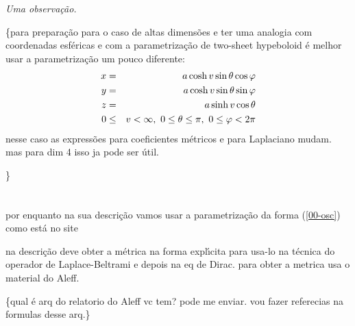 \documentclass[a4paper,12pt]{article}
\begin{document}
\textit{Uma observa\c{c}\~{a}o.}

\{para prepara\c{c}\~{a}o para o caso de altas dimens\~{o}es e ter uma
analogia com coordenadas esf\'{e}ricas e com a parametriza\c{c}\~{a}o de
two-sheet hypeboloid \'{e} melhor usar a parametriza\c{c}\~{a}o um pouco
diferente:%
\begin{eqnarray}
x &=&a\cosh v\sin \theta \cos \varphi   \label{00-osc2} \\
y &=&a\cosh v\sin \theta \sin \varphi   \notag \\
z &=&a\sinh v\cos \theta   \notag \\
0 &\leq &v<\infty ,\ 0\leq \theta \leq \pi ,\ 0\leq \varphi <2\pi   \notag
\end{eqnarray}%
nesse caso as express\~{o}es para coeficientes m\'{e}tricos e para
Laplaciano mudam. mas para dim 4 isso ja pode ser \'{u}til.

\}

$\frac{{}}{{}}$

por enquanto na sua descri\c{c}\~{a}o vamos usar a parametriza\c{c}\~{a}o da
forma (\ref{00-osc}) como est\'{a} no site

na descri\c{c}\~{a}o deve obter a m\'{e}trica na forma expl\'{\i}cita para
usa-lo na t\'{e}cnica do operador de Laplace-Beltrami e depois na eq de
Dirac. para obter a metrica usa o material do Aleff.

\{qual \'{e} arq do relatorio do Aleff vc tem? pode me enviar. vou fazer
referecias na formulas desse arq.\}
\end{document}
